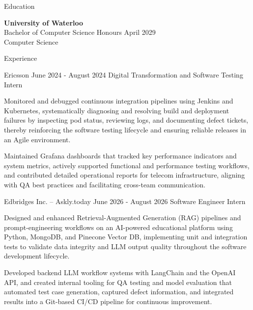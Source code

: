 \documentclass{resume}
\begin{document}
\begin{rSection}{Education}

{\fontsize{11}{15}\bf University of Waterloo} \hfill \, \\
{\fontsize{10}{12} Bachelor of Computer Science Honours} \hfill {\small April 2029} \\
{\fontsize{9}{12}\selectfont Computer Science}

\end{rSection}

\begin{rSection}{Experience}

\begin{rSubsection}
  {Ericsson}
  {\small June 2024 - August 2024}
  {Digital Transformation and Software Testing Intern}
  { }
{\fontsize{10}{12}\selectfont

  \item Monitored and debugged continuous integration pipelines using Jenkins and Kubernetes, systematically diagnosing and resolving build and deployment failures by inspecting pod status, reviewing logs, and documenting defect tickets, thereby reinforcing the software testing lifecycle and ensuring reliable releases in an Agile environment.

  \item Maintained Grafana dashboards that tracked key performance indicators and system metrics, actively supported functional and performance testing workflows, and contributed detailed operational reports for telecom infrastructure, aligning with QA best practices and facilitating cross-team communication.

}
\end{rSubsection}
\vspace{-3mm}

\begin{rSubsection}
  {Edbridges Inc. -- Askly.today}
  {\small June 2026 - August 2026}
  {Software Engineer Intern}
  { }
{\fontsize{10}{12}\selectfont

  \item Designed and enhanced Retrieval-Augmented Generation (RAG) pipelines and prompt-engineering workflows on an AI-powered educational platform using Python, MongoDB, and Pinecone Vector DB, implementing unit and integration tests to validate data integrity and LLM output quality throughout the software development lifecycle.

  \item Developed backend LLM workflow systems with LangChain and the OpenAI API, and created internal tooling for QA testing and model evaluation that automated test case generation, captured defect information, and integrated results into a Git-based CI/CD pipeline for continuous improvement.

}
\end{rSubsection}
\vspace{-3mm}

\end{rSection}
\end{document}
